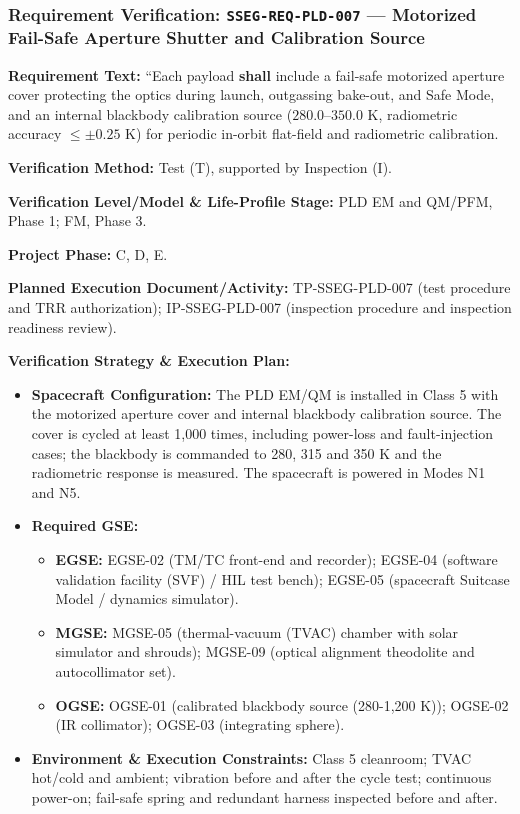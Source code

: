 \subsubsection{Requirement Verification: \texttt{SSEG-REQ-PLD-007} --- Motorized Fail-Safe Aperture Shutter and Calibration Source}
\label{ver:SSEG-REQ-PLD-007}
\textbf{Requirement Text:} ``Each payload \textbf{shall} include a fail-safe motorized aperture cover protecting the optics during launch, outgassing bake-out, and Safe Mode, and an internal blackbody calibration source ($280.0\text{--}350.0\text{ K}$, radiometric accuracy $\le \pm 0.25\text{ K}$) for periodic in-orbit flat-field and radiometric calibration.
\par\textbf{Verification Method:} Test (T), supported by Inspection (I).
\par\textbf{Verification Level/Model \& Life-Profile Stage:} PLD EM and QM/PFM, Phase 1; FM, Phase 3.
\par\textbf{Project Phase:} C, D, E.
\par\textbf{Planned Execution Document/Activity:} TP-SSEG-PLD-007 (test procedure and TRR authorization); IP-SSEG-PLD-007 (inspection procedure and inspection readiness review).
\par\textbf{Verification Strategy \& Execution Plan:}
\begin{itemize}
\item \textbf{Spacecraft Configuration:} The PLD EM/QM is installed in Class 5 with the motorized aperture cover and internal blackbody calibration source. The cover is cycled at least 1,000 times, including power-loss and fault-injection cases; the blackbody is commanded to 280, 315 and 350 K and the radiometric response is measured. The spacecraft is powered in Modes N1 and N5.
\item \textbf{Required GSE:}
\begin{itemize}
\item \textbf{EGSE:} EGSE-02 (TM/TC front-end and recorder); EGSE-04 (software validation facility (SVF) / HIL test bench); EGSE-05 (spacecraft Suitcase Model / dynamics simulator).
\item \textbf{MGSE:} MGSE-05 (thermal-vacuum (TVAC) chamber with solar simulator and shrouds); MGSE-09 (optical alignment theodolite and autocollimator set).
\item \textbf{OGSE:} OGSE-01 (calibrated blackbody source (280-1,200 K)); OGSE-02 (IR collimator); OGSE-03 (integrating sphere).
\end{itemize}
\item \textbf{Environment \& Execution Constraints:} Class 5 cleanroom; TVAC hot/cold and ambient; vibration before and after the cycle test; continuous power-on; fail-safe spring and redundant harness inspected before and after.
\end{itemize}
